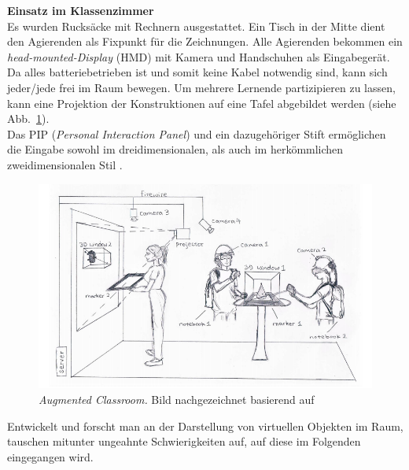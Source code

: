 \documentclass[deutsch]{llncs}
\begin{document}
 \textbf{Einsatz im Klassenzimmer} \\
Es wurden Rucksäcke mit Rechnern ausgestattet. Ein Tisch in der Mitte dient den Agierenden als Fixpunkt für die Zeichnungen. Alle Agierenden bekommen ein \emph{head-mounted-Display} (HMD) mit Kamera und Handschuhen als Eingabegerät. Da alles batteriebetrieben ist und somit keine Kabel notwendig sind, kann sich jeder/jede frei im Raum bewegen. 
Um mehrere Lernende partizipieren zu lassen, kann eine Projektion der Konstruktionen auf eine Tafel abgebildet werden (siehe Abb.~\ref{fig:samplefigure}). \\
Das PIP (\emph{Personal Interaction Panel}) und ein dazugehöriger Stift ermöglichen die Eingabe sowohl im dreidimensionalen, als auch im herkömmlichen zweidimensionalen Stil \cite{1667626}. 

\begin{figure}[h]
	\centering
	\includegraphics[width=1\textwidth]{figures/classroom}
	\caption{\emph{Augmented Classroom.} Bild nachgezeichnet basierend auf \cite{Kaufmann:2002:MGE:1242073.1242086} }
	\label{fig:samplefigure}
\end{figure}

 Entwickelt und forscht man an der Darstellung von virtuellen Objekten im Raum, tauschen mitunter ungeahnte Schwierigkeiten auf, auf diese im Folgenden eingegangen wird.
\end{document}
